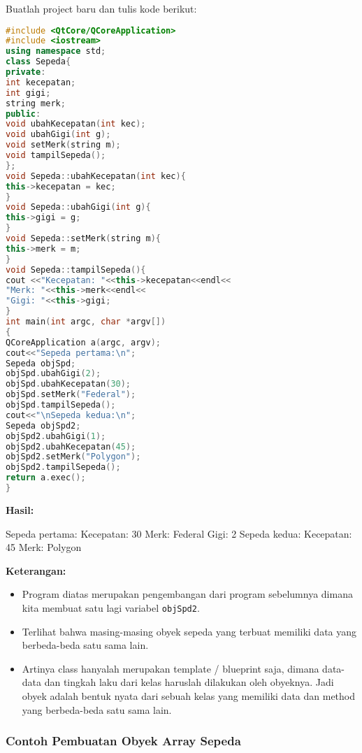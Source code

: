 Buatlah project baru dan tulis kode berikut:

\begin{lstlisting}[language=c++, caption=Pembuatan obyek Sepeda, label=contoh6-2]
#include <QtCore/QCoreApplication>
#include <iostream>
using namespace std;
class Sepeda{
private:
int kecepatan;
int gigi;
string merk;
public:
void ubahKecepatan(int kec);
void ubahGigi(int g);
void setMerk(string m);
void tampilSepeda();
};
void Sepeda::ubahKecepatan(int kec){
this->kecepatan = kec;
}
void Sepeda::ubahGigi(int g){
this->gigi = g;
}
void Sepeda::setMerk(string m){
this->merk = m;
}
void Sepeda::tampilSepeda(){
cout <<"Kecepatan: "<<this->kecepatan<<endl<<
"Merk: "<<this->merk<<endl<<
"Gigi: "<<this->gigi;
}
int main(int argc, char *argv[])
{
QCoreApplication a(argc, argv);
cout<<"Sepeda pertama:\n";
Sepeda objSpd;
objSpd.ubahGigi(2);
objSpd.ubahKecepatan(30);
objSpd.setMerk("Federal");
objSpd.tampilSepeda();
cout<<"\nSepeda kedua:\n";
Sepeda objSpd2;
objSpd2.ubahGigi(1);
objSpd2.ubahKecepatan(45);
objSpd2.setMerk("Polygon");
objSpd2.tampilSepeda();
return a.exec();
}
\end{lstlisting}

\textbf{Hasil:}

\begin{lcverbatim}
Sepeda pertama:
Kecepatan: 30
Merk: Federal
Gigi: 2
Sepeda kedua:
Kecepatan: 45
Merk: Polygon
\end{lcverbatim}

\textbf{Keterangan:}

\begin{itemize}

\item
  Program diatas merupakan pengembangan dari program sebelumnya dimana
  kita membuat satu lagi variabel \texttt{objSpd2}.
\item
  Terlihat bahwa masing-masing obyek sepeda yang terbuat memiliki data
  yang berbeda-beda satu sama lain.
\item
  Artinya class hanyalah merupakan template / blueprint saja, dimana
  data-data dan tingkah laku dari kelas haruslah dilakukan oleh
  obyeknya. Jadi obyek adalah bentuk nyata dari sebuah kelas yang
  memiliki data dan method yang berbeda-beda satu sama lain.
\end{itemize}

\subsubsection*{Contoh  Pembuatan Obyek Array Sepeda}

